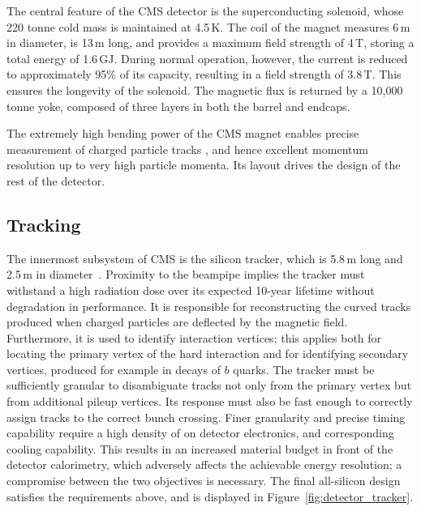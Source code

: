 The central feature of the CMS detector is the superconducting solenoid, whose 220 tonne cold mass is maintained at 4.5\,K. %
The coil of the magnet measures 6\,m in diameter, is 13\,m long, and provides a maximum field strength of 4\,T, storing a total energy of 1.6\,GJ.
During normal operation, however, the current is reduced to approximately 95\% of its capacity, resulting in a field strength of 3.8\,T.
This ensures the longevity of the solenoid.
The magnetic flux is returned by a 10,000 tonne yoke, composed of three layers in both the barrel and endcaps.

The extremely high bending power of the CMS magnet enables precise measurement of charged particle tracks , 
and hence excellent momentum resolution up to very high particle momenta.
Its layout drives the design of the rest of the detector.

\subsection{Tracking}

The innermost subsystem of CMS is the silicon tracker, which is 5.8\,m long and 2.5\,m in diameter~\cite{CMSdetector,TrackReco}. 
Proximity to the beampipe implies the tracker must withstand a high radiation dose over its expected 10-year lifetime without degradation in performance.
It is responsible for reconstructing the curved tracks produced when charged particles are deflected by the magnetic field. %
Furthermore, it is used to identify interaction vertices; 
this applies both for locating the primary vertex of the hard interaction and for identifying secondary vertices, produced for example in decays of $b$ quarks.
The tracker must be sufficiently granular to disambiguate tracks not only from the primary vertex but from additional pileup vertices.
Its response must also be fast enough to correctly assign tracks to the correct bunch crossing.
Finer granularity and precise timing capability require a high density of on detector electronics, and corresponding cooling capability.
This results in an increased material budget in front of the detector calorimetry, which adversely affects the achievable energy resolution; 
a compromise between the two objectives is necessary.
The final all-silicon design satisfies the requirements above, and is displayed in Figure~\ref{fig:detector_tracker}.

